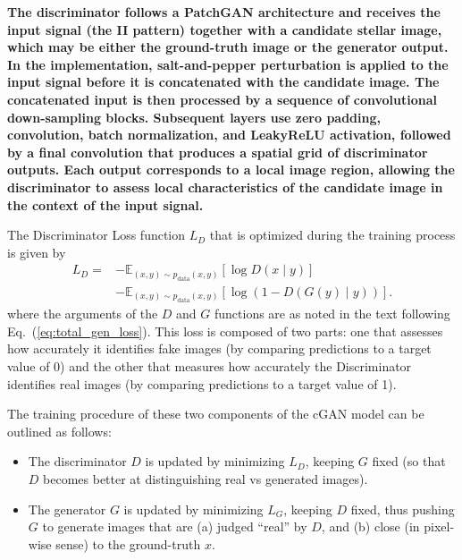 {\bf The discriminator follows a PatchGAN architecture \citep{isola2017image} and receives the input signal (the II pattern) together with a candidate stellar image, which may be either the ground-truth image or the generator output. In the implementation, salt-and-pepper perturbation is applied to the input signal before it is concatenated with the candidate image. The concatenated input is then processed by a sequence of convolutional down-sampling blocks. Subsequent layers use zero padding, convolution, batch normalization, and LeakyReLU activation, followed by a final convolution that produces a spatial grid of discriminator outputs. Each output corresponds to a local image region, allowing the discriminator to assess local characteristics of the candidate image in the context of the input signal.}

The Discriminator Loss function $L_D$ that is optimized during the training process is given by 
\begin{equation}
	\begin{aligned}
		L_D ={}&
		-\mathbb{E}_{(x,y)\sim p_{\mathrm{data}}(x,y)}
		\left[\log D(x\mid y)\right]\\
		&-\mathbb{E}_{(x,y)\sim p_{\mathrm{data}}(x,y)}
		\left[\log\left(1-D(G(y)\mid y)\right)\right].
	\end{aligned}
	\label{eq:discriminator_loss}
\end{equation}
where the arguments of the $D$ and $G$ functions are as noted in the text following Eq.~(\ref{eq:total_gen_loss}). This loss is composed of two parts: one that assesses how accurately it identifies fake images (by comparing predictions to a target value of 0) and the other that measures how accurately the Discriminator identifies real images (by comparing predictions to a target value of 1).

The training procedure of these two components of the cGAN model can be outlined as follows:
\begin{itemize}
\item{The discriminator \(D\) is updated by minimizing \(L_D\), keeping \(G\) fixed (so that \(D\) becomes better at distinguishing real vs generated images).}  
\item{The generator \(G\) is updated by minimizing \(L_G\), keeping \(D\) fixed, thus pushing \(G\) to generate images that are (a) judged “real” by \(D\), and (b) close (in pixel-wise sense) to the ground-truth \(x\).} 
\end{itemize}

